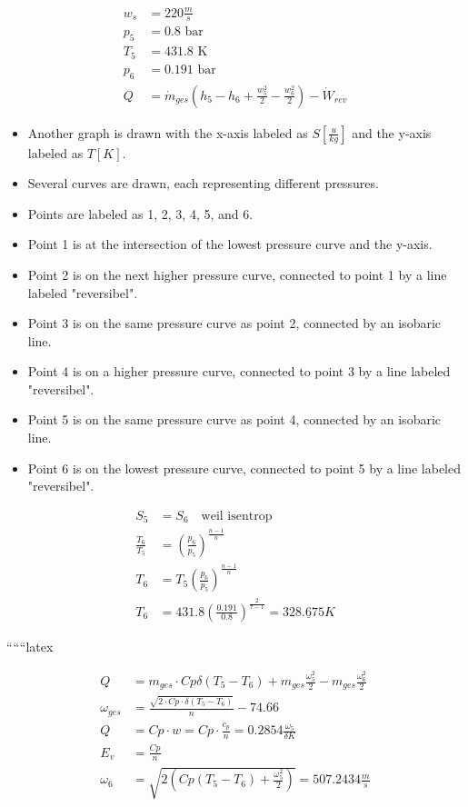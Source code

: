 \begin{align*}
    w_s &= 220 \frac{m}{s} \\
    p_5 &= 0.8 \text{ bar} \\
    T_5 &= 431.8 \text{ K} \\
    p_6 &= 0.191 \text{ bar} \\
    Q &= \dot{m}_{ges} \left( h_5 - h_6 + \frac{w_5^2}{2} - \frac{w_6^2}{2} \right) - \dot{W}_{rev}
\end{align*}

\begin{itemize}
    \item Another graph is drawn with the x-axis labeled as $S \left[ \frac{u}{kg} \right]$ and the y-axis labeled as $T \left[ K \right]$.
    \item Several curves are drawn, each representing different pressures.
    \item Points are labeled as 1, 2, 3, 4, 5, and 6.
    \item Point 1 is at the intersection of the lowest pressure curve and the y-axis.
    \item Point 2 is on the next higher pressure curve, connected to point 1 by a line labeled "reversibel".
    \item Point 3 is on the same pressure curve as point 2, connected by an isobaric line.
    \item Point 4 is on a higher pressure curve, connected to point 3 by a line labeled "reversibel".
    \item Point 5 is on the same pressure curve as point 4, connected by an isobaric line.
    \item Point 6 is on the lowest pressure curve, connected to point 5 by a line labeled "reversibel".
\end{itemize}

\begin{align*}
    S_5 &= S_6 \quad \text{weil isentrop} \\
    \frac{T_6}{T_5} &= \left( \frac{p_6}{p_5} \right)^{\frac{n-1}{n}} \\
    T_6 &= T_5 \left( \frac{p_6}{p_5} \right)^{\frac{n-1}{n}} \\
    T_6 &= 431.8 \left( \frac{0.191}{0.8} \right)^{\frac{2}{7-1}} = \underline{328.675 K}
\end{align*}

``````latex


\begin{align*}
Q &= m_{ges} \cdot Cp\delta (T_5 - T_6) + m_{ges} \frac{\omega_5^2}{2} - m_{ges} \frac{\omega_6^2}{2} \\
\omega_{ges} &= \frac{\sqrt{2 \cdot Cp \cdot \delta (T_5 - T_6)}}{n} - 74.66 \\
Q &= Cp \cdot w = Cp \cdot \frac{c_p}{n} = 0.2854 \frac{\omega_5}{\delta K} \\
E_v &= \frac{Cp}{n} \\
\omega_6 &= \sqrt{2 \left( Cp (T_5 - T_6) + \frac{\omega_5^2}{2} \right)} = 507.2434 \frac{m}{s}
\end{align*}

